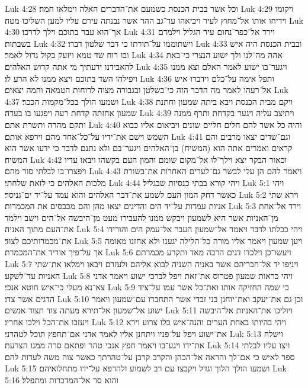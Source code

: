 Luk 4:28  וכל אשר בבית הכנסת כשמעם את־הדברים האלה וימלאו חמה׃
Luk 4:29  ויקומו וידיחו אותו אל־מחוץ לעיר ויביאהו עד־גב ההר אשר נבנתה עירם עליו למען השליכו מטה׃
Luk 4:30  אך־הוא עבר בתוכם וילך לדרכו׃
Luk 4:31  וירד אל־כפר־נחום עיר הגליל וילמדם בשבתות׃
Luk 4:32  וישתוממו על־תורתו כי דבר שלטון דברו׃
Luk 4:33  ובבית הכנסת היה איש ובו רוח שד טמא ויזעק בקול גדול לאמר׃
Luk 4:34  אהה מה־לנו ולך ישוע הנצרי כי־באת להאבידנו ידעתיך מי אתה קדוש האלהים׃
Luk 4:35  ויגער־בו ישוע לאמר האלם וצא ממנו ויפילהו השד בתוכם ויצא ממנו לא הרע לו׃
Luk 4:36  ותפל אימה על־כלם וידברו איש אל־רעהו לאמר מה הדבר הזה כי־בשלטן ובגבורה מצוה לרוחות הטמאה והמה יצאים׃
Luk 4:37  ושמעו הולך בכל־מקמות הככר׃
Luk 4:38  ויקם מבית הכנסת ויבא ביתה שמעון וחתנת שמעון אחזתה קדחת רעה ויפגעו בו בעדה׃
Luk 4:39  ויתיצב עליה ויגער בקדחת ותרף ממנה ותקם מהרה ותשרת אתם׃
Luk 4:40  והיה כל אשר להם חלים חליים שונים ויביאום אליו כבוא השמש וישם את־ידיו על־כל־אחד מהם וירפא אותם׃
Luk 4:41  וגם־שדים יצאו מרבים והם קראים ואמרים אתה הוא (המשיח) בן־האלהים ויגער־בם ולא נתנם לדבר כי ידעו אשר הוא המשיח׃
Luk 4:42  וכאור הבקר יצא וילך־לו אל־מקום שומם והמון העם בקשהו ויבאו עדיו ויפצרו־בו לבלתי סור מהם׃
Luk 4:43  ויאמר להם הן עלי לבשר גם־לערים האחרות את־בשורת מלכות האלהים כי לזאת שלחתי׃
Luk 4:44  ויהי קורא בבתי כנסיות שבגליל׃
Luk 5:1  ויהי כאשר דחק המון העם לשמע את־דבר האלהים והוא עמד על־יד ים־גניסר׃
Luk 5:2  וירא שתי אניות עמדות על־יד הים והדיגים יצאו מהן והם מכבסים את המכמרות׃
Luk 5:3  וירד אל־אחת מן־האניות אשר היא לשמעון ויבקש ממנו להעבירו מעט מן־היבשה אל־הים וישב וילמד את־העם מתוך האניה׃
Luk 5:4  ויהי ככלתו לדבר ויאמר אל־שמעון העבר אל־עמק הים והורידו את־מכמרותיכם לצוד׃
Luk 5:5  ויען שמעון ויאמר אליו מורה כל־הלילה יגענו ולא אחזנו מאומה אך על־פיך אוריד את־המכמרת׃
Luk 5:6  ויעשו־כן וילכדו דגים הרבה מאד ותקרע מכמרתם׃
Luk 5:7  ויניפו יד אל־חבריהם אשר באניה השניה לבוא אליהם ולעזרם ויבאו וימלאו את־שתי האניות עד־לשקע׃
Luk 5:8  ויהי כראות שמעון פטרוס את־זאת ויפל לברכי ישוע ויאמר אדני צא־נא מעלי כי־איש חוטא אנכי׃
Luk 5:9  כי שמה החזיקה אותו ואת־כל אשר עמו על־ציד הדגים אשר צדו׃
Luk 5:10  וכן גם את־יעקב ואת־יוחנן בני זבדי אשר התחברו עם־שמעון ויאמר ישוע אל־שמעון אל־תירא מעתה צוד תצוד אנשים׃
Luk 5:11  ויוליכו את־האניות אל־היבשה ויעזבו את־הכל וילכו אחריו׃
Luk 5:12  ויהי בהיותו באחת הערים והנה־איש כלו צרוע וירא את־ישוע ויפל על־פניו ויתחנן אליו לאמר אדני אם־תחפץ תוכל לטהרני׃
Luk 5:13  וישלח את־ידו ויגע־בו ויאמר חפץ אנכי טהר ופתאם סרה ממנו הצרעת׃
Luk 5:14  ויצו עליו לבלתי ספר לאיש כי אם־לך והראה אל־הכהן והקרב קרבן על־טהרתך כאשר צוה משה לעדות להם׃
Luk 5:15  ושמעו הולך הלוך וגדל ויקבצו עם רב לשמוע ולהרפא על־ידו מתחלואיהם׃
Luk 5:16  והוא סר אל־המדברות ומתפלל׃
